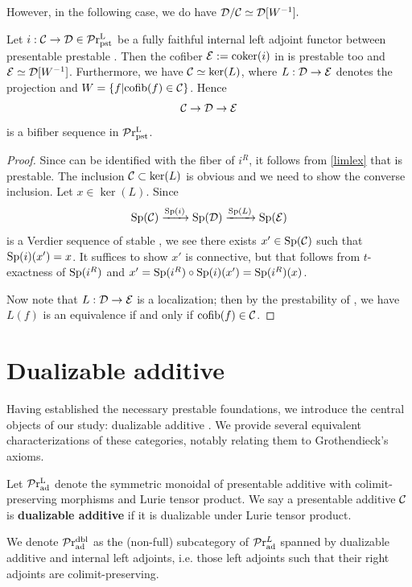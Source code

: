 \documentclass[a4paper,10pt, oneside]{amsart}
\begin{document}
	However, in the following case, we do have $\mathcal{D}/\mathcal{C}\simeq \mathcal{D}[W^{-1}].$
	\begin{prop}
			 Let $i:\mathcal{C}\to \mathcal{D} \in \mathcal{P}\mathrm{r}^\mathrm{L}_{\mathrm{pst}}$ be a fully faithful internal left adjoint functor between presentable prestable \infcats. %
		Then the cofiber $\mathcal{E}:=\mathrm{coker}(i)$ in \prl   is prestable too and $\mathcal{E}\simeq \mathcal{D}[W^{-1}]$. Furthermore, we have $\mathcal{C}\simeq \ker(L)$, where $L:\mathcal{D}\to \mathcal{E}$ denotes the projection and $W=\{f|\mathrm{cofib}(f)\in \mathcal{C}\}$. Hence $$\mathcal{C}\to\mathcal{D}\to\mathcal{E}$$ is a bifiber sequence in $\mathcal{P}\mathrm{r}^\mathrm{L}_{\mathrm{pst}}$.
	\end{prop}
	\begin{proof}
		Since \mce can be identified with the fiber of $i^R$, it follows from \cref{limlex} that \mce is prestable. The inclusion $\mathcal{C}\subset \ker(L)$ is obvious and we need to show the converse inclusion. Let $x\in\ker(L)$. Since $$\mathrm{Sp}(\mathcal{C})\xrightarrow{\mathrm{Sp}(i)} \mathrm{Sp}(\mathcal{D})\xrightarrow{\mathrm{Sp}(L)}\mathrm{Sp}(\mathcal{E})$$ is a Verdier sequence of stable \infcats, we see there exists $x'\in \mathrm{Sp}(\mathcal{C})$ such that $\mathrm{Sp}(i)(x')=x$. It suffices to show $x'$ is connective, but that follows from $t$-exactness of $\mathrm{Sp}(i^R)$ and $x'=\mathrm{Sp}(i^R)\circ \mathrm{Sp}(i)(x')=\mathrm{Sp}(i^R)(x)$. 
		
		Now note that $L:\mathcal{D}\to \mathcal{E}$ is a localization; then by the prestability of \mce, we have $L(f)$ is an equivalence if and only if $\mathrm{cofib}(f)\in \mathcal{C}$.
	\end{proof}
	
	\section{Dualizable additive \infcats}\label{section2}
	Having established the necessary prestable foundations, we introduce the central objects of our study: dualizable additive \infcats. We provide several equivalent characterizations of these categories, notably relating them to Grothendieck's  axioms.
	\begin{de}
		Let $\mathcal{P}\mathrm{r}_{\mathrm{ad}}^{\mathrm{L}}$ denote the symmetric monoidal \infcat of presentable additive \infcats with colimit-preserving morphisms and Lurie tensor product. We say a presentable additive \infcat $\mathcal{C}$ is \textbf{dualizable additive} if it is dualizable under Lurie tensor product. 
		
		We denote  $\mathcal{P}\mathrm{r}_{\mathrm{ad}}^{\mathrm{dbl}}$ as the (non-full) subcategory of $\mathcal{P}\mathrm{r}_{\mathrm{ad}}^L$ spanned by dualizable additive \infcats and internal left adjoints, i.e. those left adjoints such that their right adjoints are colimit-preserving.
	\end{de}
\end{document}
